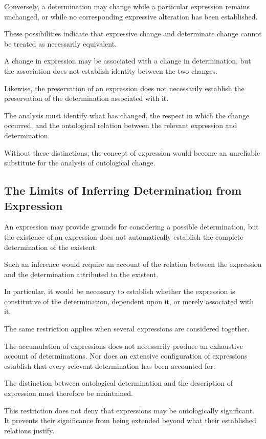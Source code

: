 Conversely, a determination may change while
a particular expression remains unchanged,
or while no corresponding expressive alteration
has been established.

These possibilities indicate that expressive change
and determinate change cannot be treated as
necessarily equivalent.

A change in expression may be associated with
a change in determination, but the association
does not establish identity between the two changes.

Likewise, the preservation of an expression does
not necessarily establish the preservation of
the determination associated with it.

The analysis must identify what has changed,
the respect in which the change occurred,
and the ontological relation between the relevant
expression and determination.

Without these distinctions, the concept of expression
would become an unreliable substitute for the
analysis of ontological change.

\subsection{The Limits of Inferring Determination from Expression}

An expression may provide grounds for considering
a possible determination, but the existence of
an expression does not automatically establish
the complete determination of the existent.

Such an inference would require an account of
the relation between the expression and the
determination attributed to the existent.

In particular, it would be necessary to establish
whether the expression is constitutive of the
determination, dependent upon it, or merely
associated with it.

The same restriction applies when several expressions
are considered together.

The accumulation of expressions does not necessarily
produce an exhaustive account of determinations.
Nor does an extensive configuration of expressions
establish that every relevant determination has
been accounted for.

The distinction between ontological determination
and the description of expression must therefore
be maintained.

This restriction does not deny that expressions
may be ontologically significant. It prevents
their significance from being extended beyond
what their established relations justify.

